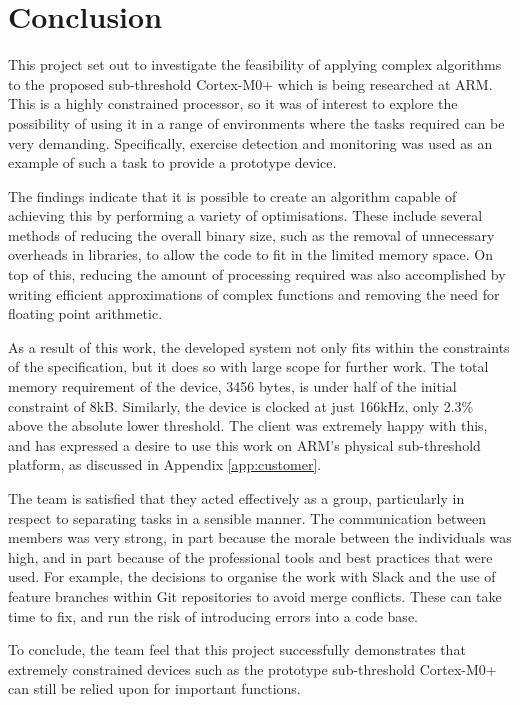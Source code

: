 \chapter{Conclusion}

This project set out to investigate the feasibility of applying complex algorithms to the proposed sub-threshold Cortex-M0+ which is being researched at ARM. This is a highly constrained processor, so it was of interest to explore the possibility of using it in a range of environments where the tasks required can be very demanding. Specifically, exercise detection and monitoring was used as an example of such a task to provide a prototype device.

The findings indicate that it is possible to create an algorithm capable of achieving this by performing a variety of optimisations. These include several methods of reducing the overall binary size, such as the removal of unnecessary overheads in libraries, to allow the code to fit in the limited memory space. On top of this, reducing the amount of processing required was also accomplished by writing efficient approximations of complex functions and removing the need for floating point arithmetic.

As a result of this work, the developed system not only fits within the constraints of the specification, but it does so with large scope for further work. The total memory requirement of the device, 3456 bytes, is under half of the initial constraint of 8kB. Similarly, the device is clocked at just 166kHz, only 2.3\% above the absolute lower threshold. The client was extremely happy with this, and has expressed a desire to use this work on ARM's physical sub-threshold platform, as discussed in Appendix \ref{app:customer}.

The team is satisfied that they acted effectively as a group, particularly in respect to separating tasks in a sensible manner. The communication between members was very strong, in part because the morale between the individuals was high, and in part because of the professional tools and best practices that were used. For example, the decisions to organise the work with Slack and the use of feature branches within Git repositories to avoid merge conflicts. These can take time to fix, and run the risk of introducing errors into a code base.

To conclude, the team feel that this project successfully demonstrates that extremely constrained devices such as the prototype sub-threshold Cortex-M0+ can still be relied upon for important functions.
